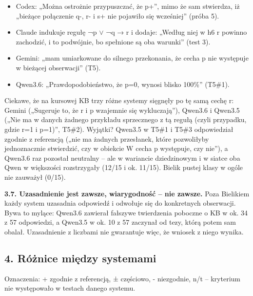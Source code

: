 \documentclass[
  polish,
]{article}
\providecommand{\tightlist}{%
  \setlength{\itemsep}{0pt}\setlength{\parskip}{0pt}}
\begin{document}
\begin{itemize}
\tightlist
\item
  Codex: „Można ostrożnie przypuszczać, że p+'', mimo że sam stwierdza,
  iż „bieżące połączenie q-, r- i s+ nie pojawiło się wcześniej'' (próba
  5).
\item
  Claude indukuje regułę ¬p \(\lor\) ¬q → r i dodaje: „Według niej w h6
  r powinno zachodzić, i to podwójnie, bo spełnione są oba warunki''
  (test 3).
\item
  Gemini: „mam umiarkowane do silnego przekonania, że cecha p nie
  występuje w bieżącej obserwacji'' (T5).
\item
  Qwen3.6: „Prawdopodobieństwo, że p=0, wynosi blisko 100\%'' (T5\#1).
\end{itemize}

Ciekawe, że na kursowej KB trzy różne systemy sięgnęły po tę samą cechę
r: Gemini („Sugeruje to, że r i p wzajemnie się wykluczają''), Qwen3.6 i
Qwen3.5 („Nie ma w danych żadnego przykładu sprzecznego z tą regułą
(czyli przypadku, gdzie r=1 i p=1)'', T5\#2). Wyjątki? Qwen3.5 w T5\#1 i
T5\#3 odpowiedział zgodnie z referencją („nie ma żadnych przesłanek,
które pozwoliłyby jednoznacznie stwierdzić, czy w obiekcie W cecha p
występuje, czy nie''), a Qwen3.6 raz pozostał neutralny -- ale w
wariancie dziedzinowym i w siatce oba Qwen w większości rozstrzygały
(12/15 i ok. 11/15). Bielik pustej klasy w ogóle nie zauważył (0/15).

\textbf{3.7. Uzasadnienie jest zawsze, wiarygodność -- nie zawsze.} Poza
Bielikiem każdy system uzasadnia odpowiedź i odwołuje się do konkretnych
obserwacji. Bywa to mylące: Qwen3.6 zawierał fałszywe twierdzenia
poboczne o KB w ok. 34 z 57 odpowiedzi, a Qwen3.5 w ok. 10 z 57 zaczynał
od tezy, którą potem sam obalał. Uzasadnienie z liczbami nie gwarantuje
więc, że wniosek z niego wynika.

\newpage
\subsection{4. Różnice między systemami}

Oznaczenia: + zgodnie z referencją, ± częściowo, - niezgodnie, n/t --
kryterium nie występowało w testach danego systemu.
\end{document}
